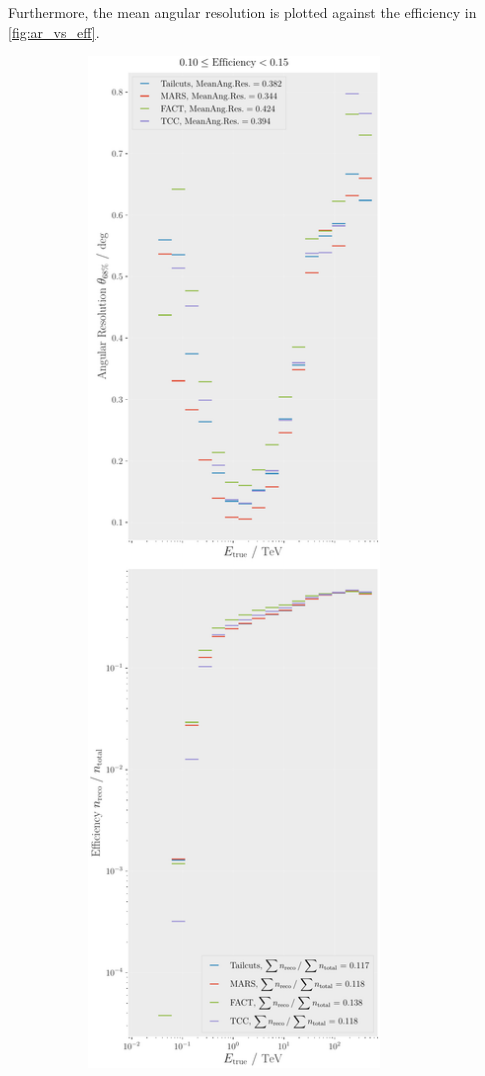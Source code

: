 Furthermore, the mean angular resolution is plotted against the efficiency in \autoref{fig:ar_vs_eff}.
\vspace{-0.2cm}
\begin{figure}
    \centering
    \begin{subfigure}{0.48\textwidth}
        \centering
        \includegraphics[width=0.85\textwidth]{plots/ar_aeff/AR_Aeff_MST_0.10_0.15.pdf}

\end{subfigure}
\end{figure}
